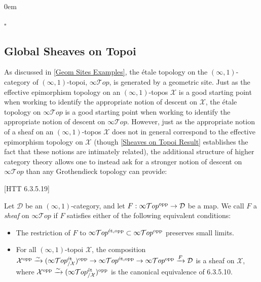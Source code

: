 \documentclass[10pt]{article}
\newcommand{\cD}{\mathcal{D}}
\newcommand{\cT}{\mathcal{T}}
\newcommand{\cX}{\mathcal{X}}
\renewcommand{\qed}{\hfill$\square$}
\renewenvironment{proof}{\begin{addmargin}[1em]{0em}\begin{newproof}}{\end{newproof}\end{addmargin}\qed}
\theoremstyle{witharg}
\theoremstyle{witharg}
\theoremstyle{witharg2}
\begin{document}
\begin{proof}
    
\end{proof}





\subsection{Global Sheaves on Topoi}\label{Global Sheaves Section}



As discussed in \ref{Geom Sites Examples}, the \'{e}tale topology on the $(\infty,1)$-category of $(\infty,1)$-topoi, $\infty\cT op$, is generated by a geometric site. Just as the effective epimorphism topology on an $(\infty,1)$-topos $\cX$ is a good starting point when working to identify the appropriate notion of descent on $\cX$, the \'{e}tale topology on $\infty\cT op$ is a good starting point when working to identify the appropriate notion of descent on $\infty\cT op$. However, just as the appropriate notion of a sheaf on an $(\infty,1)$-topos $\cX$ does not in general correspond to the effective epimorphism topology on $\cX$ (though \ref{Sheaves on Topoi Result} establishes the fact that these notions are intimately related), the additional structure of higher category theory allows one to instead ask for a stronger notion of descent on $\infty\cT op$ than any Grothendieck topology can provide:



\begin{definition}{}[HTT 6.3.5.19]\label{Global Sheaves on Topoi Defn}

    Let $\cD$ be an $(\infty,1)$-category, and let $F:\infty\cT op^{\textnormal{opp}}\rightarrow \cD$ be a map. We call $F$ a \emph{sheaf} on $\infty\cT op$ if $F$ satisfies either of the following equivalent conditions:

    \begin{itemize}
    
        \item [$(1)$] The restriction of $F$ to $\infty\cT op^{\textnormal{\'{e}t},\textnormal{opp}}\subset \infty\cT op^{\textnormal{opp}}$ preserves small limits.

        \item [$(2)$] For all $(\infty,1)$-topoi $\cX$, the composition $\cX^{\textnormal{opp}}\xrightarrow{\sim}(\infty\cT op^{\textnormal{\'{e}t}}_{/\cX})^{\textnormal{opp}}\rightarrow \infty\cT op^{\textnormal{\'{e}t},\textnormal{opp}}\rightarrow \infty\cT op^{\textnormal{opp}}\xrightarrow{F}\cD$ is a sheaf on $\cX$, where $\cX^{\textnormal{opp}}\xrightarrow{\sim}(\infty\cT op^{\textnormal{\'{e}t}}_{/\cX})^{\textnormal{opp}}$ is the canonical equivalence of  6.3.5.10. 
        
    \end{itemize}
    
\end{definition}
\end{document}
